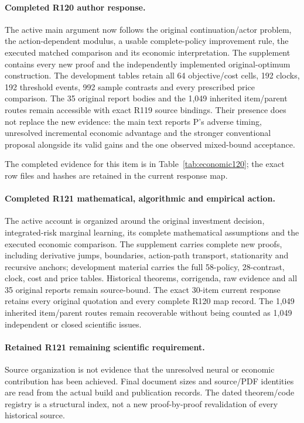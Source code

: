 \paragraph{Completed R120 author response.}
The active main argument now follows the original continuation/actor problem, the action-dependent modulus, a usable complete-policy improvement rule, the executed matched comparison and its economic interpretation. The supplement contains every new proof and the independently implemented original-optimum construction. The development tables retain all 64 objective/cost cells, 192 clocks, 192 threshold events, 992 sample contrasts and every prescribed price comparison. The 35 original report bodies and the 1,049 inherited item/parent routes remain accessible with exact R119 source bindings. Their presence does not replace the new evidence: the main text reports P's adverse timing, unresolved incremental economic advantage and the stronger conventional proposal alongside its valid gains and the one observed mixed-bound acceptance.

The completed evidence for this item is in Table~\ref{tab:economic120}; the exact row files and hashes are retained in the current response map.

\paragraph{Completed R121 mathematical, algorithmic and empirical action.}
The active account is organized around the original investment decision, integrated-risk marginal learning, its complete mathematical assumptions and the executed economic comparison. The supplement carries complete new proofs, including derivative jumps, boundaries, action-path transport, stationarity and recursive anchors; development material carries the full 58-policy, 28-contrast, clock, cost and price tables. Historical theorems, corrigenda, raw evidence and all 35 original reports remain source-bound. The exact 30-item current response retains every original quotation and every complete R120 map record. The 1,049 inherited item/parent routes remain recoverable without being counted as 1,049 independent or closed scientific issues.

\paragraph{Retained R121 remaining scientific requirement.}
Source organization is not evidence that the unresolved neural or economic contribution has been achieved. Final document sizes and source/PDF identities are read from the actual build and publication records. The dated theorem/code registry is a structural index, not a new proof-by-proof revalidation of every historical source.

